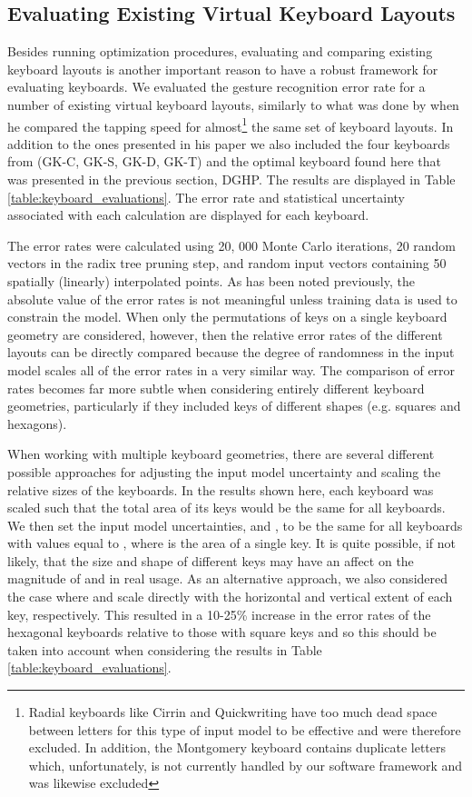 \documentclass[final,1p,times,authoryear]{elsarticle}
\begin{document}
\subsection{Evaluating Existing Virtual Keyboard Layouts}
Besides running optimization procedures, evaluating and comparing existing keyboard layouts is another 
important reason to have a robust framework for evaluating keyboards. We evaluated the gesture recognition error rate
for a number of existing virtual keyboard layouts, similarly to what was done by \cite{fastSwiping} when he compared the 
tapping speed for almost\footnote{Radial keyboards like Cirrin and Quickwriting have too much dead space between letters
for this type of input model to be effective and were therefore excluded. In addition, the Montgomery keyboard contains duplicate
letters which, unfortunately, is not currently handled by our software framework and was likewise excluded} 
the same set of keyboard layouts. In addition to the ones presented in his paper we also included the four
keyboards from \cite{googleKeyboard} (GK-C, GK-S, GK-D, GK-T) and the optimal keyboard found here that was presented
in the previous section, DGHP.
The results are displayed in Table \ref{table:keyboard_evaluations}.
The error rate and statistical uncertainty associated with each calculation are displayed for each keyboard. 

The error rates were calculated using 20, 000 Monte Carlo iterations, 20 random vectors in the radix tree pruning step, and random input vectors containing 50 spatially (linearly) interpolated points. As has been noted previously, the absolute value of the error rates is not meaningful unless training data is used to constrain the model. When only the permutations of keys on a single keyboard geometry are considered, however, then the relative error rates of the different layouts can be directly compared because the degree of randomness in the input model scales all of the error rates in a very similar way. The comparison of error rates becomes far more subtle when considering entirely different keyboard geometries, particularly if they included keys of different shapes (e.g. squares and hexagons).

When working with multiple keyboard geometries, there are several different possible approaches for adjusting the input model uncertainty and scaling the relative sizes of the keyboards. In the results shown here, each keyboard was scaled such that the total area of its keys would be the same for all keyboards. We then set the input model uncertainties,  and , to be the same for all keyboards with values equal to , where  is the area of a single key. It is quite possible, if not likely, that the size and shape of different keys may have an affect on the magnitude of  and  in real usage. As an alternative approach, we also considered the case where  and  scale directly with the horizontal and vertical extent of each key, respectively. This resulted in a 10-25\% increase in the error rates of the hexagonal keyboards relative to those with square keys and so this should be taken into account when considering the results in Table \ref{table:keyboard_evaluations}.
\end{document}
